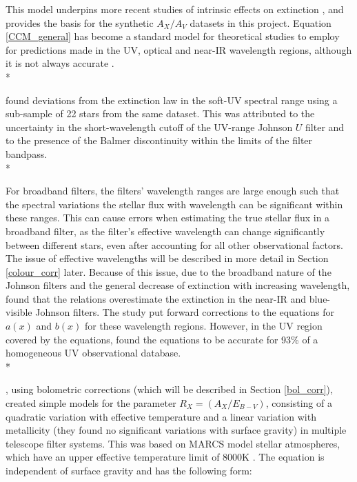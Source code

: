 \documentclass[12pt, a4paper]{report}
\begin{document}
This model underpins more recent studies of intrinsic effects on extinction \citep{2008PASP..120..583G,2014MNRAS.444..392C,2018MNRAS.475.5023C,2018MNRAS.479L.102C}, and provides the basis for the synthetic $A_{X}/A_{V}$ datasets in this project. Equation \ref{CCM_general} has become a standard model for theoretical studies to employ for predictions made in the UV, optical and near-IR wavelength regions, although it is not always accurate \citep{1994ApJ...422..158O,1999PASP..111...63F}. \\*

\cite{1994ApJ...422..158O} found deviations from the \cite{1989ApJ...345..245C} extinction law in the soft-UV spectral range using a sub-sample of 22 stars from the same dataset. This was attributed to the uncertainty in the short-wavelength cutoff of the UV-range Johnson $U$ filter and to the presence of the Balmer discontinuity within the limits of the filter bandpass.\\*

For broadband filters, the filters' wavelength ranges are large enough such that the spectral variations the stellar flux with wavelength can be significant within these ranges. This can cause errors when estimating the true stellar flux in a broadband filter, as the filter's effective wavelength can change significantly between different stars, even after accounting for all other observational factors. The issue of effective wavelengths will be described in more detail in Section \ref{colour_corr} later. Because of this issue, due to the broadband nature of the Johnson filters and the general decrease of extinction with increasing wavelength, \cite{1999PASP..111...63F} found that the \cite{1989ApJ...345..245C} relations overestimate the extinction in the near-IR and blue-visible Johnson filters. The study put forward corrections to the equations for $a(x)$ and $b(x)$ for these wavelength regions. However, in the UV region covered by the \cite{1989ApJ...345..245C} equations, \cite{2004ApJ...616..912V} found the equations to be accurate for 93\% of a homogeneous UV observational database.\\*

\cite{2014MNRAS.444..392C,2018MNRAS.475.5023C,2018MNRAS.479L.102C}, using bolometric corrections (which will be described in Section \ref{bol_corr}), created simple  models for the parameter $R_{X}  = (A_{X}/E_{B-V})$, consisting of a quadratic variation with effective temperature and a linear variation with metallicity (they found no significant variations with surface gravity) in multiple telescope filter systems. This was based on MARCS model stellar atmospheres, which have an upper effective temperature limit of 8000K \citep{2008A&A...486..951G}. The equation is independent of surface gravity and has the following form:
\end{document}
